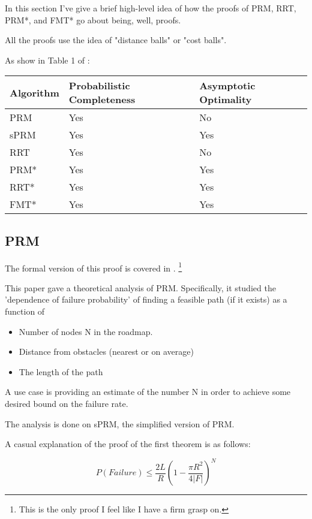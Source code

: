 \documentclass[a4paper]{article}
\begin{document}
In this section I've give a brief high-level idea of how the proofs of PRM,
RRT, PRM*, and FMT* go about being, well, proofs.

All the proofs use the idea of "distance balls" or "cost balls".

As show in Table 1 of \cite{RRT*}:

\begin{tabular}{ | l | p{2.5cm} | p{2cm} |}
    \hline
    Algorithm & Probabilistic Completeness  & Asymptotic Optimality  \\
    \hline
    PRM     & Yes & No  \\
    sPRM    & Yes & Yes \\
    RRT     & Yes & No \\
    \hline
    PRM*    & Yes & Yes  \\
    RRT*    & Yes & Yes \\
    FMT*    & Yes & Yes \\
    \hline
\end{tabular}


\subsection{PRM}

The formal version of this proof is covered in \cite{PRM}.  \footnote{This is
the only proof I feel like I have a firm grasp on.}

This paper gave a theoretical analysis of PRM. Specifically, it studied the
'dependence of failure probability' of finding a feasible path (if it exists) as
a function of 
\begin{itemize}
    \item Number of nodes N in the roadmap.
    \item Distance from obstacles (nearest or on average) 
    \item The length of the path 
\end{itemize}

A use case is providing an estimate of the number N in order to achieve some
desired bound on the failure rate.

The analysis is done on sPRM, the simplified version of PRM.

A casual explanation of the proof of the first theorem is as follows:

\begin{equation}
    P(Failure) \leq \frac{2L}{R}\left( 1 - \frac{\pi R^2}{4|F|}\right)^N
\end{equation}
\end{document}
